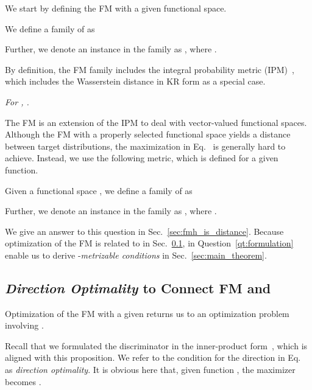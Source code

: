 We start by defining the FM with a given functional space.
\begin{definition}
We define a family of  as

Further, we denote an instance in the family as , where .
\end{definition}
By definition, the FM family includes the integral probability metric (IPM)~\citep{alfred1997integral}, which includes the Wasserstein distance in KR form as a special case.
\begin{proposition}
\textit{
For , .
}


 \label{pr:fm_is_distance}
\end{proposition}
The FM is an extension of the IPM to deal with vector-valued functional spaces.
Although the FM with a properly selected functional space yields a distance between target distributions, the maximization in Eq.~ is generally hard to achieve. Instead, we use the following metric, which is defined for a given function.
\begin{definition}
Given a functional space , we define a family of  as

Further, we denote an instance in the family as , where .
\end{definition}
We give an answer to this question in Sec.~\ref{sec:fmh_is_distance}. Because optimization of the FM is related to  in Sec.~\ref{ssec:direction_optimality},  in Question~\ref{qt:formulation} enable us to derive -\textit{metrizable conditions} in Sec.~\ref{sec:main_theorem}.
\begin{question}
\label{qt:formulation}
\end{question}


\subsection{\textit{Direction Optimality} to Connect FM and }
\label{ssec:direction_optimality}

Optimization of the FM with a given  returns us to an optimization problem involving .
Recall that we formulated the discriminator in the inner-product form~, which is aligned with this proposition.
We refer to the condition for the direction in Eq.~ as \textit{direction optimality}.
It is obvious here that, given function , the maximizer  becomes . 

